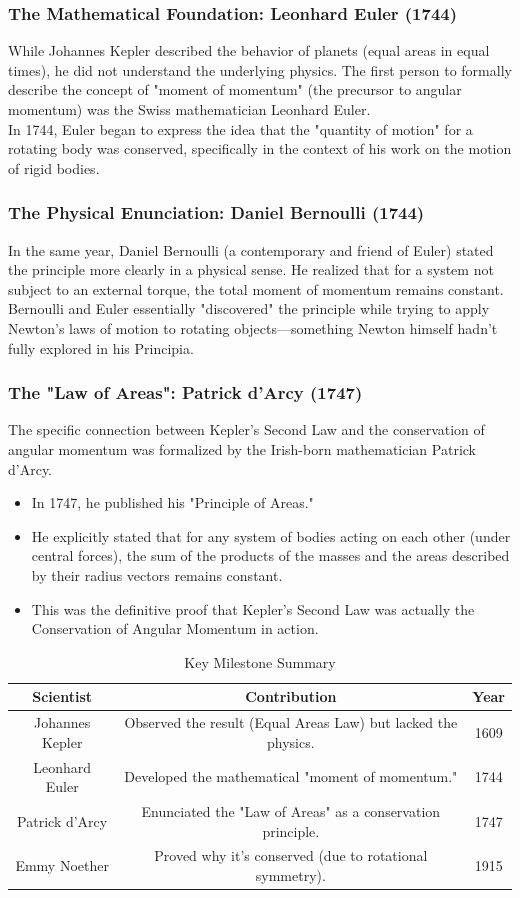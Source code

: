 \documentclass[a4paper,10pt]{article}
\begin{document}
\subsubsection{The Mathematical Foundation: Leonhard Euler (1744)}
While Johannes Kepler described the behavior of planets (equal areas in equal times), he did not understand the underlying physics. The first person to formally describe the concept of "moment of momentum" (the precursor to angular momentum) was the Swiss mathematician Leonhard Euler.\\
In 1744, Euler began to express the idea that the "quantity of motion" for a rotating body was conserved, specifically in the context of his work on the motion of rigid bodies.
\subsubsection{The Physical Enunciation: Daniel Bernoulli (1744)}
In the same year, Daniel Bernoulli (a contemporary and friend of Euler) stated the principle more clearly in a physical sense. He realized that for a system not subject to an external torque, the total moment of momentum remains constant.
Bernoulli and Euler essentially "discovered" the principle while trying to apply Newton’s laws of motion to rotating objects—something Newton himself hadn't fully explored in his Principia.
\subsubsection{The "Law of Areas": Patrick d'Arcy (1747)}
The specific connection between Kepler’s Second Law and the conservation of angular momentum was formalized by the Irish-born mathematician Patrick d'Arcy.
\begin{itemize}
\item In 1747, he published his "Principle of Areas."
\item He explicitly stated that for any system of bodies acting on each other (under central forces), the sum of the products of the masses and the areas described by their radius vectors remains constant.
\item This was the definitive proof that Kepler's Second Law was actually the Conservation of Angular Momentum in action.
\end{itemize}
\begin{table}[h!]
\begin{center}
\begin{tabular}{|c|c|c|}
\hline
\textbf{Scientist}&\textbf{Contribution}&\textbf{Year}\\
\hline
Johannes Kepler&Observed the result (Equal Areas Law) but lacked the physics.&1609\\
\hline
Leonhard Euler&Developed the mathematical "moment of momentum."&1744\\
\hline
Patrick d'Arcy&Enunciated the "Law of Areas" as a conservation principle.&1747\\
\hline
Emmy Noether&Proved why it's conserved (due to rotational symmetry).& 1915\\
\hline
\end{tabular}
\end{center}
\caption{Key Milestone Summary}
\end{table}
\end{document}
